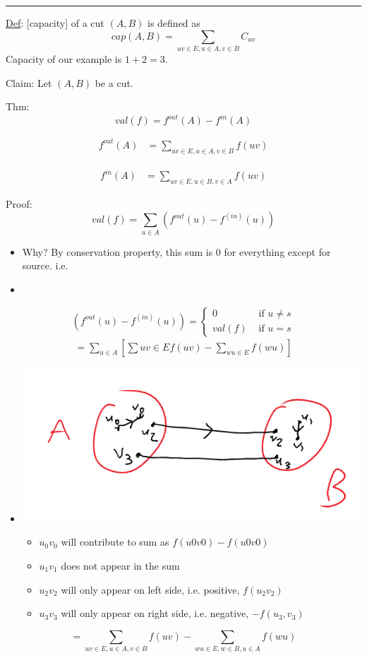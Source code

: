 \documentclass[11pt]{article}
\begin{document}
\noindent\rule{\textwidth}{0.5pt}
\uline{Def}: [capacity] of a cut \((A,B)\) is defined as 
$$ cap(A,B) = \sum_{uv \in E, u\in A, v\in B}C_{uv}$$
Capacity of our example is \(1+2 = 3\).

Claim: Let \((A,B)\) be a cut.

Thm:
$$val(f) = f^{out}(A) - f^{in}(A)$$
\begin{minipage}{.5\textwidth}
\begin{align*}
f^{out}(A) & = \sum_{uv \in E, u \in A, v \in B} f(uv)
\end{align*}
\end{minipage}
\vline
\begin{minipage}{.5\textwidth}
\begin{align*}
f^{in}(A) & = \sum_{uv \in E, u \in B, v \in A} f(uv)
\end{align*}
\end{minipage}
Proof:
$$val(f)=\sum_{u\in A} \left(f^{out}(u)-f^(in)(u)\right) $$
\begin{itemize}
\item Why? By conservation property, this sum is \(0\) for everything except for source. i.e.
\item 
\end{itemize}
\begin{equation*}
\left(f^{out}(u)-f^(in)(u)\right) = 
\begin{cases}
0 & \text{ if }u \neq s
\\ val(f) & \text{ if } u=s 
\end{cases}
\end{equation*}
\begin{align*}
= \sum_{u\in A}\left[\sum{uv \in E}f(uv)-\sum_{wu\in E}f(wu)\right]
\end{align*}
\begin{itemize}
\item \begin{center}
\includegraphics[width=.9\linewidth]{./Images/i118.png}
\end{center}
\begin{itemize}
\item \(u_0v_0\) will contribute to sum as \(f(u0v0) - f(u0v0)\)
\item \(u_1v_1\) does not appear in the sum
\item \(u_2v_2\) will only appear on left side, i.e. positive, \(f(u_2v_2)\)
\item \(u_3v_3\) will only appear on right side, i.e. negative, \(-f(u_3,v_3)\)
\end{itemize}
\end{itemize}
$$=\sum_{uv \in E, u \in A, v \in B}f(uv)-\sum_{wu \in E, w\in B, u \in A}f(wu)$$
\end{document}
